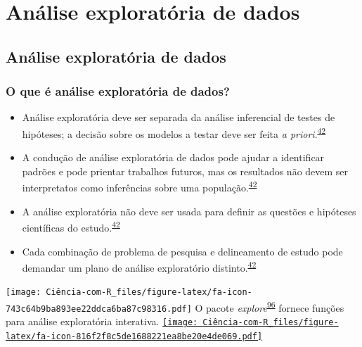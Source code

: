 \documentclass[
]{book}
\begin{document}
\hypertarget{analise-exploratoria-dados}{%
\chapter{\texorpdfstring{\textbf{Análise exploratória de dados}}{Análise exploratória de dados}}\label{analise-exploratoria-dados}}

\hypertarget{analise-exploratoria}{%
\section{Análise exploratória de dados}\label{analise-exploratoria}}

\hypertarget{o-que-uxe9-anuxe1lise-exploratuxf3ria-de-dados}{%
\subsection{O que é análise exploratória de dados?}\label{o-que-uxe9-anuxe1lise-exploratuxf3ria-de-dados}}

\begin{itemize}
\item
  Análise exploratória deve ser separada da análise inferencial de testes de hipóteses; a decisão sobre os modelos a testar deve ser feita \emph{a priori}.\textsuperscript{\protect\hyperlink{ref-zuur2009}{42}}
\item
  A condução de análise exploratória de dados pode ajudar a identificar padrões e pode prientar trabalhos futuros, mas os resultados não devem ser interpretatos como inferências sobre uma população.\textsuperscript{\protect\hyperlink{ref-zuur2009}{42}}
\item
  A análise exploratória não deve ser usada para definir as questões e hipóteses científicas do estudo.\textsuperscript{\protect\hyperlink{ref-zuur2009}{42}}
\item
  Cada combinação de problema de pesquisa e delineamento de estudo pode demandar um plano de análise exploratório distinto.\textsuperscript{\protect\hyperlink{ref-zuur2009}{42}}
\end{itemize}

\texttt{[image: Ciência-com-R\_files/figure-latex/fa-icon-743c64b9ba893ee22ddca6ba87c98316.pdf]} O pacote \emph{explore}\textsuperscript{\protect\hyperlink{ref-explore}{96}} fornece funções para análise exploratória interativa. \href{https://cran.r-project.org/web/packages/explore/vignettes/explore.html}{\texttt{[image: Ciência-com-R\_files/figure-latex/fa-icon-816f2f8c5de1688221ea8be20e4de069.pdf]}}
\end{document}
